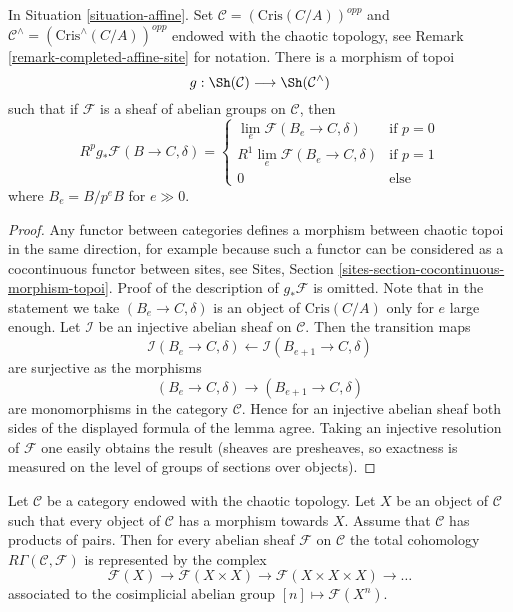 \begin{lemma}
\label{lemma-complete}
In Situation \ref{situation-affine}.
Set $\mathcal{C} = (\text{Cris}(C/A))^{opp}$ and
$\mathcal{C}^\wedge = (\text{Cris}^\wedge(C/A))^{opp}$
endowed with the chaotic topology, see
Remark \ref{remark-completed-affine-site} for notation.
There is a morphism of topoi
$$
g : \Sh(\mathcal{C}) \longrightarrow \Sh(\mathcal{C}^\wedge)
$$
such that if $\mathcal{F}$ is a sheaf of abelian groups on
$\mathcal{C}$, then
$$
R^pg_*\mathcal{F}(B \to C, \delta) =
\left\{
\begin{matrix}
\lim_e \mathcal{F}(B_e \to C, \delta) & \text{if }p = 0 \\
R^1\lim_e \mathcal{F}(B_e \to C, \delta) & \text{if }p = 1 \\
0 & \text{else}
\end{matrix}
\right.
$$
where $B_e = B/p^eB$ for $e \gg 0$.
\end{lemma}

\begin{proof}
Any functor between categories defines a morphism between chaotic
topoi in the same direction, for example because such a functor
can be considered as a cocontinuous functor between sites, see
Sites, Section \ref{sites-section-cocontinuous-morphism-topoi}.
Proof of the description of $g_*\mathcal{F}$ is omitted.
Note that in the statement we take $(B_e \to C, \delta)$
is an object of $\text{Cris}(C/A)$  only for $e$ large enough.
Let $\mathcal{I}$ be an injective abelian sheaf on $\mathcal{C}$.
Then the transition maps
$$
\mathcal{I}(B_e \to C, \delta) \leftarrow
\mathcal{I}(B_{e + 1} \to C, \delta)
$$
are surjective as the morphisms
$$
(B_e \to C, \delta)
\longrightarrow
(B_{e + 1} \to C, \delta)
$$
are monomorphisms in the category $\mathcal{C}$. Hence for an injective
abelian sheaf both sides of the displayed formula of the lemma agree.
Taking an injective resolution of $\mathcal{F}$ one easily obtains
the result (sheaves are presheaves, so exactness is measured on the
level of groups of sections over objects).
\end{proof}

\begin{lemma}
\label{lemma-category-with-covering}
Let $\mathcal{C}$ be a category endowed with the chaotic topology.
Let $X$ be an object of $\mathcal{C}$ such that every object of
$\mathcal{C}$ has a morphism towards $X$. Assume that $\mathcal{C}$
has products of pairs.
Then for every abelian sheaf $\mathcal{F}$ on $\mathcal{C}$
the total cohomology $R\Gamma(\mathcal{C}, \mathcal{F})$ is represented
by the complex
$$
\mathcal{F}(X) \to \mathcal{F}(X \times X) \to
\mathcal{F}(X \times X \times X) \to \ldots
$$
associated to the cosimplicial abelian group $[n] \mapsto \mathcal{F}(X^n)$.
\end{lemma}

